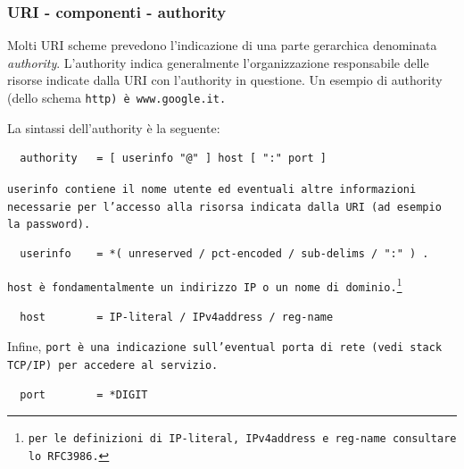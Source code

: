 \documentclass[8pt]{beamer}
\begin{document}
\begin{frame}[fragile]
	\frametitle{URI - componenti - authority}
	
	Molti URI scheme prevedono l'indicazione di una parte
	gerarchica denominata \emph{authority}. L'authority indica
	generalmente l'organizzazione responsabile delle risorse
	indicate dalla URI con l'authority in questione.
	Un esempio di authority (dello schema \tt{http}) \`e \tt{www.google.it}.
    \vspace{\baselineskip}
    
    La sintassi dell'authority \`e la seguente:
    \begin{verbatim}
  authority   = [ userinfo "@" ] host [ ":" port ]
    \end{verbatim}    

	\tt{userinfo} contiene il nome utente ed eventuali altre informazioni 
	necessarie per l'accesso alla risorsa indicata dalla URI (ad esempio la
	password).
    \begin{verbatim}
  userinfo    = *( unreserved / pct-encoded / sub-delims / ":" ) .
    \end{verbatim}    
    
    \tt{host} \`e fondamentalmente un indirizzo IP o un nome di
    dominio.\footnote{per le definizioni di \tt{IP-literal}, \tt{IPv4address} e
    \tt{reg-name} consultare lo RFC3986.}
    \begin{verbatim}
  host        = IP-literal / IPv4address / reg-name
    \end{verbatim}    
    
    Infine, \tt{port} \`e una indicazione sull'eventual porta di rete (vedi
    stack TCP/IP) per accedere al servizio.
    \begin{verbatim}
  port        = *DIGIT
    \end{verbatim}  
\end{frame}
\end{document}
